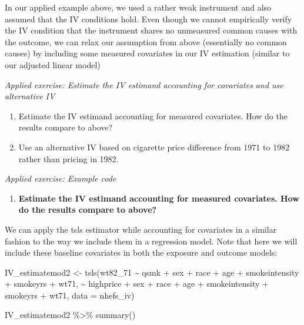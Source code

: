 \documentclass[
]{book}
\newenvironment{Shaded}{\begin{snugshade}}{\end{snugshade}}
\newcommand{\AttributeTok}[1]{\textcolor[rgb]{0.77,0.63,0.00}{#1}}
\newcommand{\FunctionTok}[1]{\textcolor[rgb]{0.00,0.00,0.00}{#1}}
\newcommand{\NormalTok}[1]{#1}
\newcommand{\OtherTok}[1]{\textcolor[rgb]{0.56,0.35,0.01}{#1}}
\newcommand{\SpecialCharTok}[1]{\textcolor[rgb]{0.00,0.00,0.00}{#1}}
\providecommand{\tightlist}{%
  \setlength{\itemsep}{0pt}\setlength{\parskip}{0pt}}
\begin{document}
In our applied example above, we used a rather weak instrument and also assumed that the IV conditions hold. Even though we cannot empirically verify the IV condition that the instrument shares no unmeasured common causes with the outcome, we can relax our assumption from above (essentially no common causes) by including some measured covariates in our IV estimation (similar to our adjusted linear model)

\emph{Applied exercise: Estimate the IV estimand accounting for covariates and use alternative IV}

\begin{enumerate}
\def\labelenumi{\arabic{enumi}.}
\tightlist
\item
  Estimate the IV estimand accounting for measured covariates. How do the results compare to above?
\item
  Use an alternative IV based on cigarette price difference from 1971 to 1982 rather than pricing in 1982.
\end{enumerate}

\emph{Applied exercise: Example code}

\begin{enumerate}
\def\labelenumi{\arabic{enumi}.}
\tightlist
\item
  \textbf{Estimate the IV estimand accounting for measured covariates. How do the results compare to above?}
\end{enumerate}

We can apply the tsls estimator while accounting for covariates in a similar fashion to the way we include them in a regression model. Note that here we will include these baseline covariates in both the exposure and outcome models:

\begin{Shaded}
\begin{Highlighting}[]
\NormalTok{IV\_estimatemod2 }\OtherTok{\textless{}{-}} \FunctionTok{tsls}\NormalTok{(wt82\_71 }\SpecialCharTok{\textasciitilde{}}\NormalTok{ qsmk }\SpecialCharTok{+}\NormalTok{ sex }\SpecialCharTok{+}\NormalTok{ race }\SpecialCharTok{+}\NormalTok{ age }\SpecialCharTok{+} 
\NormalTok{                          smokeintensity }\SpecialCharTok{+}\NormalTok{ smokeyrs }\SpecialCharTok{+}\NormalTok{ wt71, }
                        \SpecialCharTok{\textasciitilde{}}\NormalTok{ highprice }\SpecialCharTok{+}\NormalTok{ sex }\SpecialCharTok{+}\NormalTok{ race }\SpecialCharTok{+}\NormalTok{ age }\SpecialCharTok{+} 
\NormalTok{                          smokeintensity }\SpecialCharTok{+}\NormalTok{ smokeyrs }\SpecialCharTok{+}\NormalTok{ wt71, }
                        \AttributeTok{data =}\NormalTok{ nhefs\_iv)}

\NormalTok{IV\_estimatemod2 }\SpecialCharTok{\%\textgreater{}\%}
  \FunctionTok{summary}\NormalTok{()}
\end{Highlighting}
\end{Shaded}
\end{document}
